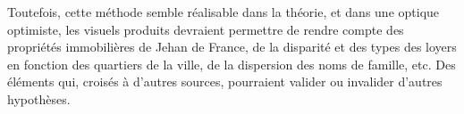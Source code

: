 Toutefois, cette méthode semble réalisable dans la théorie, et dans une optique optimiste,  les visuels produits devraient permettre de rendre compte des propriétés immobilières de Jehan de France, de la disparité et des types des loyers en fonction des quartiers de la ville, de la dispersion des noms de famille, etc. Des éléments qui, croisés  à d'autres sources, pourraient valider ou invalider d'autres hypothèses. 


